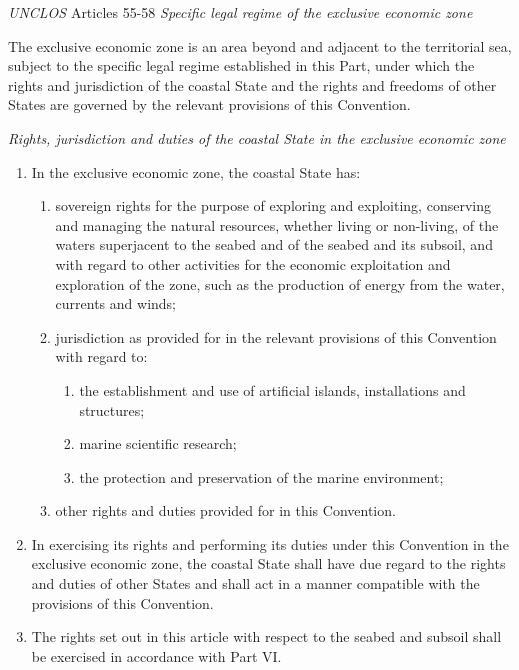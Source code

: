 \begin{conventiondetails}{\textit{UNCLOS} Articles 55-58}
    \flushleft
    \textit{Specific legal regime of the exclusive economic zone}

    \vspace{\baselineskip}

    The exclusive economic zone is an area beyond and adjacent to the territorial sea, subject to the specific legal regime established in this Part, under which the rights and jurisdiction of the coastal State and the rights and freedoms of other States are governed by the relevant provisions of this Convention.

    \textit{Rights, jurisdiction and duties of the coastal State in the exclusive economic zone}
    \begin{enumerate}
        \item In the exclusive economic zone, the coastal State has:
        \begin{enumerate}[label=(\alph*)]
            \item sovereign rights for the purpose of exploring and exploiting, conserving and managing the natural resources, whether living or non-living, of the waters superjacent to the seabed and of the seabed and its subsoil, and with regard to other activities for the economic exploitation and exploration of the zone, such as the production of energy from the water, currents and winds;
            \item jurisdiction as provided for in the relevant provisions of this Convention with regard to:
            \begin{enumerate}[label=(\roman*)]
                \item the establishment and use of artificial islands, installations and structures;
                \item marine scientific research;
                \item the protection and preservation of the marine environment;
            \end{enumerate}
            \item other rights and duties provided for in this Convention.
        \end{enumerate}
        \item In exercising its rights and performing its duties under this Convention in the exclusive economic zone, the coastal State shall have due regard to the rights and duties of other States and shall act in a manner compatible with the provisions of this Convention.
        \item The rights set out in this article with respect to the seabed and subsoil shall be exercised in accordance with Part VI.
    \end{enumerate}


\end{conventiondetails}

